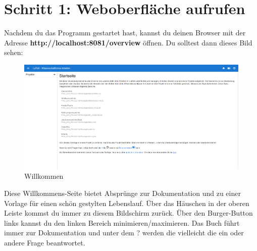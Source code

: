 \documentclass[12pt]{article}
\begin{document}
\section{Schritt 1: Weboberfläche aufrufen}
Nachdem du das Programm gestartet hast, kannst du deinen Browser mit der Adresse \textbf{http://localhost:8081/overview} öffnen. Du solltest dann dieses Bild sehen:
\FloatBarrier
\begin{figure}[!ht]
\includegraphics[width=.9\textwidth]{images/welcome.png}
\caption{Willkommen}
\end{figure}
\FloatBarrier
\noindent Diese Willkommens-Seite bietet Absprünge zur Dokumentation und zu einer Vorlage für einen schön gestylten Lebenslauf. Über das Häuschen in der oberen Leiste kommst du immer zu diesem Bildschirm zurück. Über den Burger-Button links kannst du den linken Bereich minimieren/maximieren. Das Buch führt immer zur Dokumentation und unter dem ? werden die vielleicht die ein oder andere Frage beantwortet.
\end{document}
